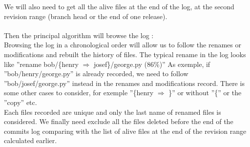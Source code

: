 We will also need to get all the alive files at the end of the log, at the second revision range (branch head or the end of one release).\\\\
Then the principal algorithm will browse the log :\\
Browsing the log in a chronological order will allow us to follow the renames or modifications and rebuilt the history of files.
The typical rename in the log looks like ''rename bob/\{henry $\Rightarrow$ josef\}/george.py (86\%)''
As exemple, if ''bob/henry/george.py'' is already recorded, we need to follow ''bob/josef/george.py'' instead in the renames and modifications record.
There is some other cases to consider, for exemple ''\{henry $\Rightarrow$ \}'' or without ''\{'' or the ''copy'' etc.\\
Each files recorded are unique and only the last name of renamed files is considered.
We finally need exclude all the files deleted before the end of the commits log comparing with the list of alive files at the end of the revision range calculated earlier.\\ 	
\label{subsec:Process}
		

